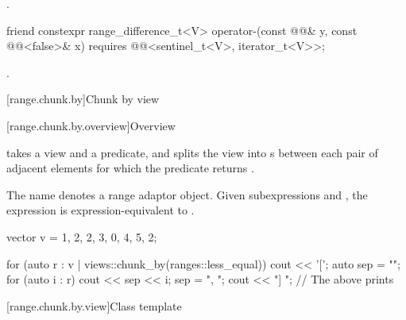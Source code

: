 \begin{itemdescr}
\pnum
\returns
{}.
\end{itemdescr}

\begin{itemdecl}
friend constexpr range_difference_t<V>
  operator-(const @@& y, const @@<false>& x)
    requires @@<sentinel_t<V>, iterator_t<V>>;
\end{itemdecl}

\begin{itemdescr}
\pnum
\returns
{}.
\end{itemdescr}

[range.chunk.by]{Chunk by view}

[range.chunk.by.overview]{Overview}

\pnum
{} takes a view and a predicate, and
splits the view into s
between each pair of adjacent elements
for which the predicate returns .

\pnum
{}%
The name  denotes
a range adaptor object.
Given subexpressions  and ,
the expression  is expression-equivalent to
.
\begin{example}
\begin{codeblock}
vector v = {1, 2, 2, 3, 0, 4, 5, 2};

for (auto r : v | views::chunk_by(ranges::less_equal{})) {
  cout << '[';
  auto sep = "";
  for (auto i : r) {
    cout << sep << i;
    sep = ", ";
  }
  cout << "] ";
}
// The above prints \tcode{[1, 2, 2, 3] [0, 4, 5] [2]}
\end{codeblock}
\end{example}

[range.chunk.by.view]{Class template }

